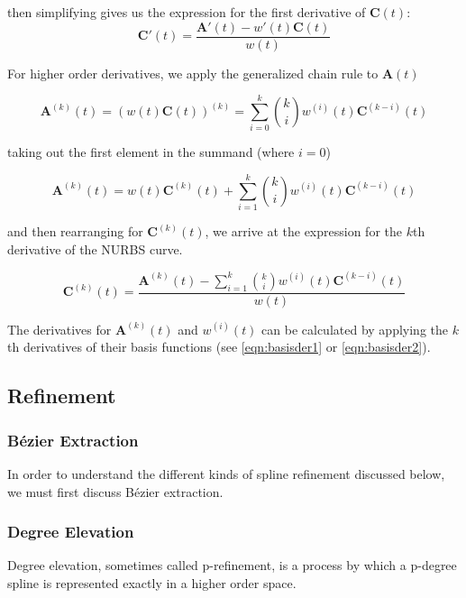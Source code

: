 then simplifying gives us the expression for the first derivative of \(\textbf{C}(t) \):
\begin{equation} 
\textbf{C}'(t) = \frac{ \textbf{A}'(t) - w'(t) \textbf{C}(t) }{ w(t) }
\end{equation}

For higher order derivatives, we apply the generalized chain rule to \(\textbf{A}(t)\)

\begin{equation} 
\textbf{A}^{(k)}(t) = (w(t)\textbf{C}(t))^{(k)} = \displaystyle \sum^k_{i=0}\binom{k}i w^{(i)} (t) \textbf{C}^{(k-i)} (t) 
\end{equation}

taking out the first element in the summand (where $i=0$)

\begin{equation} 
\textbf{A}^{(k)}(t) = w(t)\textbf{C}^{(k)}(t) + \displaystyle \sum^k_{i=1}\binom{k}i w^{(i)} (t) \textbf{C}^{(k-i)} (t) 
\end{equation}

and then rearranging for \(\textbf{C}^{(k)}(t)\), we arrive at the expression for the $k$th derivative of the NURBS curve.

\begin{equation} 
	\textbf{C}^{(k)}(t) = \frac{ \textbf{A}^{(k)}(t) - \displaystyle \sum^k_{i=1} \binom{k}i w^{(i)}(t) \textbf{C}^{(k-i)} (t) }{ w(t) }
\end{equation}

The derivatives for \(\textbf{A}^{(k)}(t)\) and \(w^{(i)}(t)\) can be calculated by applying the $k$th derivatives of their basis functions (see \cref{eqn:basisder1} or \cref{eqn:basisder2}).

\subsection{Refinement}

\subsubsection{Bézier Extraction}
In order to understand the different kinds of spline refinement discussed below, we must first discuss Bézier extraction.


\subsubsection{Degree Elevation}
Degree elevation, sometimes called p-refinement, is a process by which a p-degree spline is represented exactly in a higher order space.

